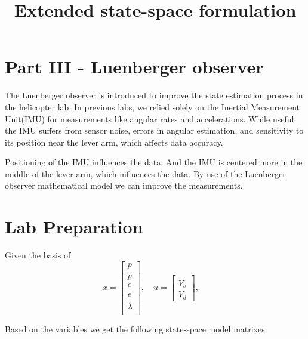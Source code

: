 
\section{Part III - Luenberger observer}



The Luenberger observer is introduced to improve the state estimation process in the helicopter lab. In previous labs, we relied solely on the Inertial Measurement Unit(IMU) for measurements like angular rates and accelerations. While useful, the IMU suffers from sensor noise, errors in angular estimation, and sensitivity to its position near the lever arm, which affects data accuracy.
\vspace{1em}

Positioning of the IMU influences the data. And the IMU is centered more in the middle of the lever arm, which influences the data.
By use of the Luenberger observer mathematical model we can improve the measurements.
\vspace{1em}

\section{Lab Preparation}
\title{\textbf{Extended state-space formulation}}
\maketitle
\vspace{1em}


Given the basis of
\[
x =
\begin{bmatrix}
{p} \\
\dot{p}\\
{e} \\
\dot{e} \\

\dot{{\lambda}} \\


\end{bmatrix}, \quad
u =
\begin{bmatrix}
\tilde{V}_s \\
V_d
\end{bmatrix}, \quad
\]

Based on the variables we get the following state-space model matrixes:

